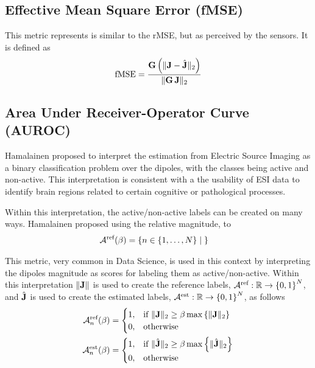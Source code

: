 \subsection{Effective Mean Square Error (fMSE)}

This metric represents is similar to the rMSE, but as perceived by the sensors.
%
It is defined as
\begin{equation}
\text{fMSE} = 
\frac{\mathbf{G}\left( \lVert \mathbf{J} - \hat{\mathbf{J}} \rVert_2 \right)}{\lVert \mathbf{G}\, \mathbf{J} \rVert_2}
\end{equation}

\subsection{Area Under Receiver-Operator Curve (AUROC)}

Hamalainen proposed to interpret the estimation from Electric Source Imaging as a binary classification problem over the dipoles, with the classes being active and non-active.
%
This interpretation is consistent with a the usability of ESI data to identify brain regions related to certain cognitive or pathological processes.

Within this interpretation, the active/non-active labels can be created on many ways. 
%
Hamalainen proposed using the relative magnitude, to 
\begin{align}
\mathcal{A}^{\text{ref}}(\beta)
&=
\left\{ n\in\left\{ 1, \dots, N \right\} \;\middle|\;   \right\}
\end{align}

This metric, very common in Data Science, is used in this context by interpreting the dipoles magnitude as scores for labeling them as active/non-active.
%
Within this interpretation $\lVert \mathbf{J} \rVert$ is used to create the reference labels, $\mathcal{A}^{\text{ref}}: \mathbb{R} \rightarrow \left\{ 0,1 \right\}^N$, and $\hat{\mathbf{J}}$ is used to create the estimated labels, $\mathcal{A}^{\text{est}}: \mathbb{R} \rightarrow \left\{ 0,1 \right\}^N$, as follows
\begin{align}
\mathcal{A}_n^{\text{ref}}(\beta)
&=
\begin{cases}
1, &\text{if }
\lVert \mathbf{J} \rVert_2 \geq \beta \max\left\{ \lVert \mathbf{J} \rVert_2 \right\}
\\
0, &\text{otherwise}
\end{cases}
\\
\mathcal{A}_n^{\text{est}}(\beta)
&=
\begin{cases}
1, &\text{if }
\lVert \hat{\mathbf{J}} \rVert_2 \geq \beta \max\left\{ \lVert \hat{\mathbf{J}} \rVert_2 \right\}
\\
0, &\text{otherwise}
\end{cases}
\end{align}

